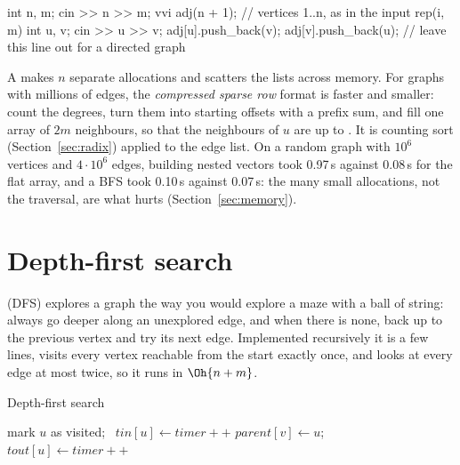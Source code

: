 \begin{code}
int n, m;
cin >> n >> m;
vvi adj(n + 1);  // vertices 1..n, as in the input
rep(i, m) {
    int u, v;
    cin >> u >> v;
    adj[u].push_back(v);
    adj[v].push_back(u);  // leave this line out for a directed graph
}
\end{code}



\begin{trick}
A  makes $n$ separate allocations and scatters the lists across memory. For graphs with millions of
edges, the \emph{compressed sparse row} format is faster and smaller: count the degrees, turn them into starting offsets with
a prefix sum, and fill one array of $2m$ neighbours, so that the neighbours of $u$ are  up to
. It is counting sort (Section~\ref{sec:radix}) applied to the edge list. On a random graph with
$10^6$ vertices and $4 \cdot 10^6$ edges, building nested vectors took 0.97\,s against 0.08\,s for the flat array, and a
BFS took 0.10\,s against 0.07\,s: the many small allocations, not the traversal, are what hurts
(Section~\ref{sec:memory}).
\end{trick}

\section[Depth-first search]{Depth-first search \hfill \silver}\label{sec:dfs}

 (DFS) explores a graph the way you would explore a maze with a ball of string: always go deeper
along an unexplored edge, and when there is none, back up to the previous vertex and try its next edge. Implemented
recursively it is a few lines, visits every vertex reachable from the start exactly once, and looks at every edge at most
twice, so it runs in $\Oh{n + m}$.

\begin{pseudo}{Depth-first search}
\begin{algorithmic}[1]
  \State mark $u$ as visited; \ $\mathit{tin}[u] \gets \mathit{timer}{+}{+}$ 
      \State $\mathit{parent}[v] \gets u$; \  
    \EndIf
  \EndFor
  \State $\mathit{tout}[u] \gets \mathit{timer}{+}{+}$ 
\EndProcedure
\end{algorithmic}
\end{pseudo}

